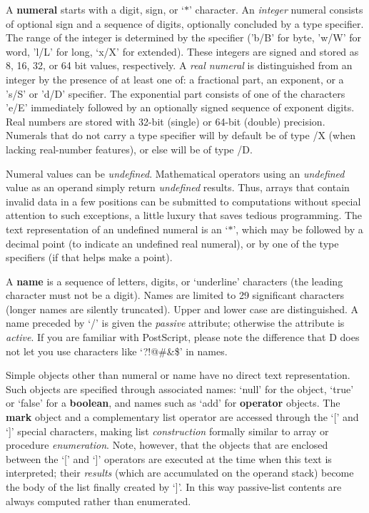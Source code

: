 A \textbf{numeral}  starts  with  a  digit,   sign,   or  `$\ast$'   character.   An \emph{integer} numeral consists of optional  sign and a sequence  of  digits, optionally concluded  by a type specifier.  The range of the  integer  is determined by the specifier ('b/B' for byte,  'w/W' for word,  'l/L'  for long, `x/X' for extended). These integers are signed and stored as 8, 16, 32, or 64 bit values, respectively. A \emph{real numeral} is distinguished from an integer  by  the  presence  of at least one  of:  a  fractional  part,  an exponent,  or a 's/S' or 'd/D'  specifier.  The exponential part consists of one  of the  characters  'e/E'  immediately followed by an optionally signed  sequence  of exponent   digits.   Real  numbers are  stored  with  32-bit   (single) or 64-bit (double) precision. Numerals that do not carry a type specifier will by default be of type /X (when lacking real-number features), or else will be of type /D.

Numeral  values  can  be  \emph{undefined}.  Mathematical  operators  using  an \emph{undefined} value as an operand simply return \emph{undefined} results. Thus, arrays that contain invalid data in a few positions can be submitted to  computations without special attention to such exceptions,  a little luxury that saves tedious programming.  The text representation of an undefined numeral  is an  `$\ast$',  which  may  be  followed by a decimal  point  (to  indicate  an undefined real numeral), or by one of the type specifiers (if that helps make a point). 

A \textbf{name} is a sequence of letters,  digits, or `underline' characters (the leading character must not be a digit). Names are limited to 29 significant characters (longer names are silently truncated).  Upper and lower case are distinguished. A name preceded by `/' is given the \emph{passive} attribute; otherwise the attribute is \emph{active}.  If you are familiar with  PostScript, please note the difference that D does not let you use characters like `?!@\#\&\$' in names.

Simple objects other than numeral or name have no direct text
representation.  Such objects are specified through associated names:
`null' for the  object, `true' or `false' for a
\textbf{boolean}, and names such as `add' for \textbf{operator}
objects.  The \textbf{mark} object and a complementary list operator
are accessed through the `[' and `]' special characters, making list
\emph{construction} formally similar to array or procedure
\emph{enumeration}. Note, however, that the objects that are enclosed
between the `[' and `]' operators are executed at the time when this
text is interpreted; their \emph{results} (which are accumulated on
the operand stack) become the body of the list finally created by
`]'. In this way passive-list contents are always computed rather than
enumerated.

